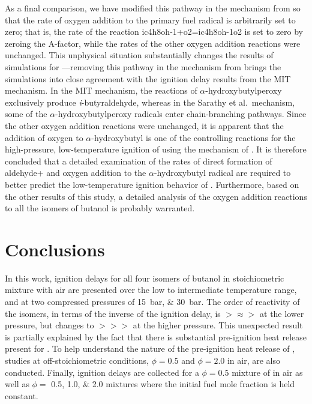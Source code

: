 \documentclass[../main.tex]{subfiles}
\begin{document}
As a final comparison, we have modified this pathway in the mechanism from
\textcite{Sarathy2012} so that the rate of oxygen addition to the primary
fuel radical is arbitrarily set to zero; that is, the rate of the reaction
ic4h8oh-1+o2=ic4h8oh-1o2 is set to zero by zeroing the $\mathrm{A}$-factor, while the
rates of the other oxygen addition reactions were unchanged. This unphysical
situation substantially changes the results of simulations for
\iBuOH{}---removing this pathway in the mechanism from
\textcite{Sarathy2012} brings the simulations into close agreement with the
ignition delay results from the MIT mechanism. In the MIT mechanism, the
reactions of $\alpha$-hydroxybutylperoxy exclusively produce
\textit{i}-butyraldehyde, whereas in the Sarathy et al.\ mechanism, some
of the $\alpha$-hydroxybutylperoxy radicals enter chain-branching
pathways. Since the other oxygen addition reactions were unchanged, it
is apparent that the addition of oxygen to $\alpha$-hydroxybutyl is one
of the controlling reactions for the high-pressure, low-temperature
ignition of \iBuOH{} using the mechanism of \textcite{Sarathy2012}. It
is therefore concluded that a detailed examination of the rates of
direct formation of aldehyde+ and oxygen addition to the
$\alpha$-hydroxybutyl radical are required to better predict the
low-temperature ignition behavior of \iBuOH{}. Furthermore, based on the
other results of this study, a detailed analysis of the oxygen addition
reactions to all the isomers of butanol is probably warranted.

\section{Conclusions}
\label{sec:buoh-conclusions}

In this work, ignition delays for all four isomers of butanol in stoichiometric
mixture with air are presented over the low to intermediate temperature
range, and at two compressed pressures of \SIlist{15;30}{\bar}. The order of
reactivity of the isomers, in terms of the inverse of the ignition delay,
is \nBuOH{}$>$\sBuOH{}$\approx$\iBuOH{}$>$\tBuOH{}
at the lower pressure, but changes to \nBuOH{}$>$\tBuOH{}$>$\sBuOH{}$>$\iBuOH{}
at the higher pressure. This unexpected result is partially explained by
the fact that there is substantial pre-ignition heat release present
for \tBuOH{}. To help understand the nature of the pre-ignition heat
release of \tBuOH{}, studies at off-stoichiometric conditions,
$\phi=\num{0.5}$ and $\phi=\num{2.0}$ in air, are also conducted. Finally,
ignition delays are collected for a $\phi=\num{0.5}$ mixture of \iBuOH{}
in air as well as $\phi=$ \numlist{0.5;1.0;2.0} mixtures where the initial
fuel mole fraction is held constant.
\end{document}
